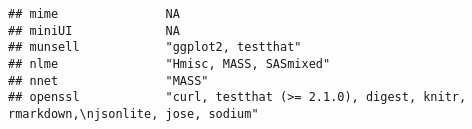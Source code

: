 \documentclass[
]{article}
\begin{document}
\begin{verbatim}
## mime               NA                                                                                                                                                                                                                                                                                                                                                                                                                                                                                
## miniUI             NA                                                                                                                                                                                                                                                                                                                                                                                                                                                                                
## munsell            "ggplot2, testthat"                                                                                                                                                                                                                                                                                                                                                                                                                                                               
## nlme               "Hmisc, MASS, SASmixed"                                                                                                                                                                                                                                                                                                                                                                                                                                                           
## nnet               "MASS"                                                                                                                                                                                                                                                                                                                                                                                                                                                                            
## openssl            "curl, testthat (>= 2.1.0), digest, knitr, rmarkdown,\njsonlite, jose, sodium"                                                                                                                                                                                                                                                                                                                                                                                                    

\end{verbatim}
\end{document}
